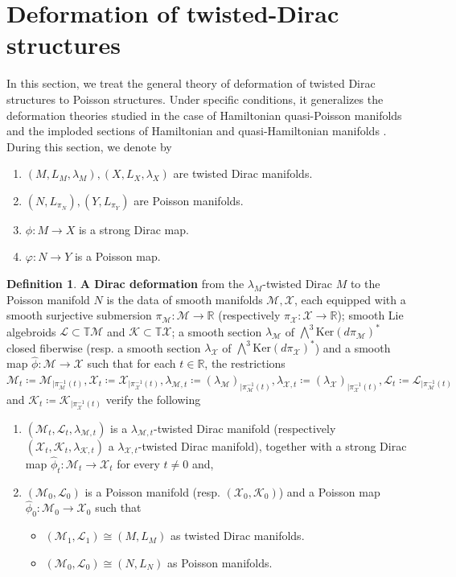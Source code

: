 \documentclass[reqno]{amsart}
\theoremstyle{plain}
\theoremstyle{definition}
\newtheorem{Def}[Thm]{Definition}
\newcommand{\R}{\mathbb{R}}
\newcommand{\too}{\longrightarrow}
\newcommand{\M}{\mathcal{M}}
\renewcommand{\L}{\mathcal{L}}
\newcommand{\X}{\mathcal{X}}
\newcommand{\Ker}{\text{Ker}}
\newcommand{\K}{\mathcal{K}}
\begin{document}
\section{Deformation of twisted-Dirac structures} \label{section 3}

In this section, we treat the general theory of deformation of twisted Dirac structures to Poisson structures. Under specific conditions, it generalizes the deformation theories studied in the case of Hamiltonian quasi-Poisson manifolds and the imploded sections of Hamiltonian and quasi-Hamiltonian manifolds \cite{maiza2026multiplicative}.\\ During this section, we denote by
\begin{enumerate}
\item $(M,L_M,\lambda_M),(X,L_X,\lambda_X)$ are twisted Dirac manifolds.
\item $(N,L_{\pi_{N}}),(Y,L_{\pi_{Y}})$ are Poisson manifolds.
\item $\phi: M \too X$ is a strong Dirac map.
\item $\varphi: N \too Y$ is a Poisson map.
\end{enumerate}

\begin{Def} \label{Dirac def}
\textbf{A Dirac deformation} from the $\lambda_{M}$-twisted Dirac $M$ to the Poisson manifold $N$ is the data of smooth manifolds $\M,\X$, each equipped with a smooth surjective submersion $\pi_\M: \M \too \R$ (respectively $\pi_\X: \X \too \R$); smooth Lie algebroids $\L \subset \mathbb{T}\M$ and $\K \subset \mathbb{T}\X$; a smooth section $\lambda_{\M}$ of $\bigwedge^3 \Ker(d\pi_\M)^*$ closed fiberwise (resp. a smooth section $\lambda_{\X}$ of $\bigwedge^{3} \Ker(d\pi_\X)^*$) and a  smooth map $\widehat{\phi}: \M \too \X$ such that for each $t\in \R$, the restrictions $\M_t \coloneqq \M_{|\pi_{\M}^{-1}(t)}, \X_t \coloneqq \X_{|\pi_{\X}^{-1}(t)},\lambda_{\M,t} \coloneqq (\lambda_{\M})_{|\pi_{\M}^{-1}(t)}, \lambda_{\X,t} \coloneqq (\lambda_{\X})_{|\pi_{\X}^{-1}(t)}, \L_t \coloneqq \L_{|\pi_{\M}^{-1}(t)}$ and $\K_t \coloneqq \K_{|\pi_{\X}^{-1}(t)}$ 
verify the following  \begin{enumerate}
    \item $(\M_t,\L_t,\lambda_{\M,t})$ is a $\lambda_{\M,t}$-twisted Dirac manifold (respectively $(\X_t,\K_t,\lambda_{\K,t})$ a $\lambda_{\X,t}$-twisted Dirac manifold), together with a strong Dirac map $\widehat{\phi}_t: \M_t \too \X_t$ for every $t\neq 0$ and,
    \item $(\M_0,\L_0)$ is a Poisson manifold (resp. $(\X_0,\K_0)$) and a Poisson map $\widehat{\phi}_0: \M_0 \too \X_0$ such that \begin{itemize}
        \item $(\M_1,\L_1) \cong (M,L_M)$ as twisted Dirac manifolds.
        \item $(\M_0,\L_0) \cong (N,L_N)$ as Poisson manifolds.
    \end{itemize}    
\end{enumerate}
\end{Def}
\end{document}
